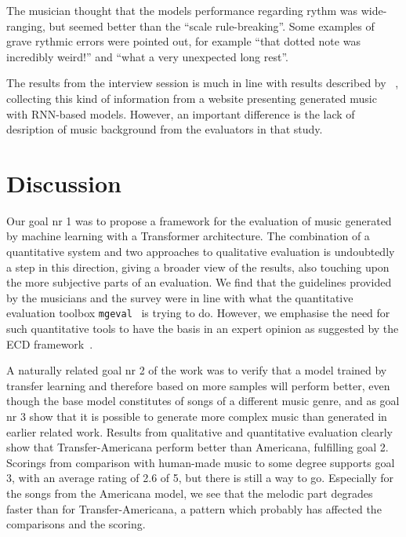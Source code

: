 \documentclass{IEEEtran}
\begin{document}
The musician thought that the models performance regarding rythm 
was wide-ranging, but seemed better than the ``scale rule-breaking''.
Some examples of grave rythmic errors were pointed out, for example
``that dotted note was incredibly weird!'' and  ``what a very unexpected 
long rest''.

The results from the interview session is much in line with results described 
by \citeauthor{sturm2017taking} ~\cite{sturm2017taking}, collecting this kind 
of information from a website presenting generated 
music with RNN-based models. However, an important difference is the lack of 
desription of music background from the evaluators in that study. 

\section{Discussion}

Our goal nr 1 was to propose a framework for the evaluation of music generated
by machine learning with a Transformer architecture.
The combination of a quantitative system and two approaches to qualitative
evaluation is undoubtedly a step in this direction, giving a broader view of 
the results, also touching upon the more
subjective parts of an evaluation. We find that the guidelines provided by 
the musicians and the survey were in line with what the quantitative evaluation 
toolbox \lstinline|mgeval|~\cite{yang2020evaluation} is trying to 
do. However, we emphasise the need for such quantitative tools to have the basis
in an expert opinion as suggested by the ECD
framework~\cite{mislevy2003focus,mislevy2017evidence}.

A naturally related goal nr 2 of the work was to verify that a model trained by transfer
learning and therefore based on more samples will perform better, even though
the base model constitutes of songs of a different music genre, and as goal nr 3 show
that it is possible to generate more complex music than generated in earlier
related work. Results from qualitative and quantitative evaluation clearly
show that Transfer-Americana perform better than Americana, fulfilling goal
2. Scorings from comparison with human-made music to some degree supports
goal 3, with an average rating of 2.6 of 5, but there is still a way to go.
Especially for the songs from the Americana model, we see that the melodic
part degrades faster than for Transfer-Americana, a pattern which probably has
affected the comparisons and the scoring.
\end{document}
